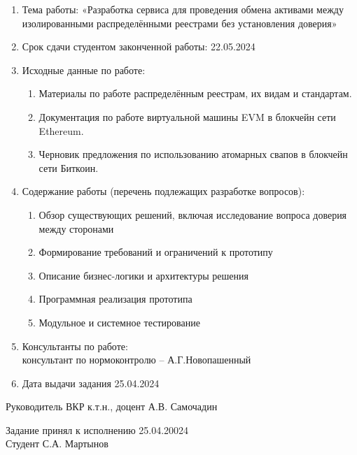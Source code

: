 \begin{center}
\begin{enumerate}[label*=\arabic*.]
\item Тема работы: «Разработка сервиса для проведения обмена активами между изолированными распределёнными реестрами без установления доверия»
\item Срок сдачи студентом законченной работы: 22.05.2024
\item Исходные данные по работе:
	\begin{enumerate}[label*=\arabic*.]
	\item Материалы по работе распределённым реестрам, их видам и стандартам.
	\item Документация по работе виртуальной машины EVM в блокчейн сети Ethereum.
	\item Черновик предложения по использованию атомарных свапов в блокчейн сети Биткоин.
	\end{enumerate}
\item Содержание работы (перечень подлежащих разработке вопросов):
	\begin{enumerate}[label*=\arabic*.]
	\item Обзор существующих решений, включая исследование вопроса доверия между сторонами
	\item Формирование требований и ограничений к прототипу
	\item Описание бизнес-логики и архитектуры решения
	\item Программная реализация прототипа
	\item Модульное и системное тестирование
	\end{enumerate}
\item Консультанты по работе:\\ консультант по нормоконтролю – А.Г.Новопашенный
\item Дата выдачи задания 25.04.2024
\end{enumerate}

\vspace{0.5cm}

\begin{flushleft}
Руководитель ВКР \hspace{2.7cm} \underline{\hspace{3cm}} \hspace{0.4cm} к.т.н., доцент А.В. Самочадин

\vspace{0.5cm}

Задание принял к исполнению 25.04.20024\\
Студент \hspace{5.0cm} \underline{\hspace{3cm}} \hspace{0.4cm} С.А. Мартынов

\end{flushleft}
\end{center}
\newpage
